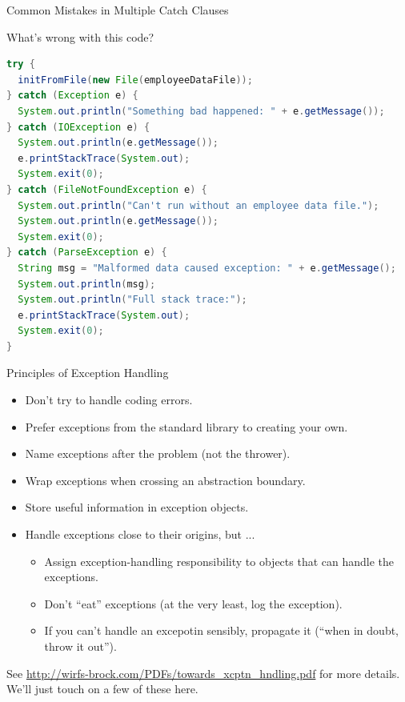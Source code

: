 \documentclass{beamer}
\begin{document}
\begin{frame}[fragile]{Common Mistakes in Multiple Catch Clauses}


What's wrong with this code?
\begin{lstlisting}[language=Java]
try {
  initFromFile(new File(employeeDataFile));
} catch (Exception e) {
  System.out.println("Something bad happened: " + e.getMessage());
} catch (IOException e) {
  System.out.println(e.getMessage());
  e.printStackTrace(System.out);
  System.exit(0);
} catch (FileNotFoundException e) {
  System.out.println("Can't run without an employee data file.");
  System.out.println(e.getMessage());
  System.exit(0);
} catch (ParseException e) {
  String msg = "Malformed data caused exception: " + e.getMessage();
  System.out.println(msg);
  System.out.println("Full stack trace:");
  e.printStackTrace(System.out);
  System.exit(0);
}
\end{lstlisting}


\end{frame}


\begin{frame}[fragile]{Principles of Exception Handling}


\begin{itemize}
\item Don't try to handle coding errors.
\item Prefer exceptions from the standard library to creating your own.
\item Name exceptions after the problem (not the thrower).
\item Wrap exceptions when crossing an abstraction boundary.
\item Store useful information in exception objects.
\item Handle exceptions close to their origins, but ...
\begin{itemize}
  \item Assign exception-handling responsibility to objects that can handle the exceptions.
  \item Don't ``eat'' exceptions (at the very least, log the exception).
  \item If you can't handle an excepotin sensibly, propagate it (``when in doubt, throw it out'').
\end{itemize}
\end{itemize}

See \url{http://wirfs-brock.com/PDFs/towards_xcptn_hndling.pdf} for more details.  We'll just touch on a few of these here.

\end{frame}
\end{document}
